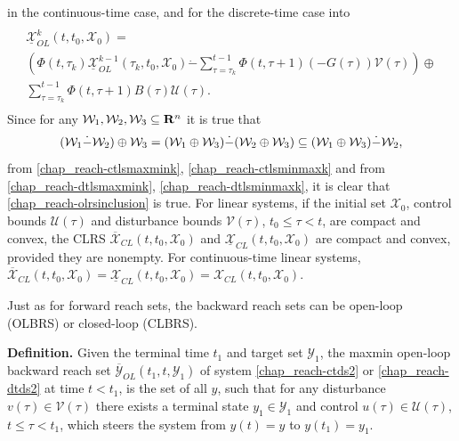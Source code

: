 \documentclass[letterpaper,10pt,english]{sphinxmanual}
\begin{document}
in the continuous-time case, and for the discrete-time case into
\label{chap_reach:equation-dtlsminmaxk}\begin{gather}
\begin{split}\begin{array}{l}
\underline{{\mathcal X}}_{OL}^k(t, t_0, {\mathcal X}_0) = \\
\left(\Phi(t, \tau_k)\underline{{\mathcal X}}_{OL}^{k-1}(\tau_k, t_0, {\mathcal X}_0) \dot{-}
\sum_{\tau=\tau_k}^{t-1}\Phi(t, \tau+1)(-G(\tau)){\mathcal V}(\tau)\right)
\oplus \\
\sum_{\tau=\tau_k}^{t-1}\Phi(t, \tau+1)B(\tau){\mathcal U}(\tau).
\end{array}\end{split}\label{chap_reach-dtlsminmaxk}
\end{gather}
Since for any
\({\mathcal W}_1, {\mathcal W}_2, {\mathcal W}_3 \subseteq {\bf R}^n\)
it is true that
\begin{gather}
\begin{split}({\mathcal W}_1 \dot{-} {\mathcal W}_2) \oplus {\mathcal W}_3 =
({\mathcal W}_1 \oplus {\mathcal W}_3) \dot{-} ({\mathcal W}_2 \oplus {\mathcal W}_3) \subseteq
({\mathcal W}_1 \oplus {\mathcal W}_3) \dot{-} {\mathcal W}_2,\end{split}\notag
\end{gather}
from \eqref{chap_reach-ctlsmaxmink}, \eqref{chap_reach-ctlsminmaxk} and from \eqref{chap_reach-dtlsmaxmink},
\eqref{chap_reach-dtlsminmaxk}, it is clear that \eqref{chap_reach-olrsinclusion} is true.
For linear systems, if the initial set \({\mathcal X}_0\), control
bounds \({\mathcal U}(\tau)\) and disturbance bounds
\({\mathcal V}(\tau)\), \(t_0\leqslant\tau<t\), are compact and
convex, the CLRS
\(\overline{{\mathcal X}}_{CL}(t, t_0, {\mathcal X}_0)\) and
\(\underline{{\mathcal X}}_{CL}(t, t_0, {\mathcal X}_0)\) are
compact and convex, provided they are nonempty. For continuous-time
linear systems,
\(\overline{{\mathcal X}}_{CL}(t, t_0, {\mathcal X}_0) = \underline{{\mathcal X}}_{CL}(t, t_0, {\mathcal X}_0) = {\mathcal X}_{CL}(t, t_0, {\mathcal X}_0)\).

Just as for forward reach sets, the backward reach sets can be open-loop
(OLBRS) or closed-loop (CLBRS).

\textbf{Definition.} Given the terminal time \(t_1\) and target set
\({\mathcal Y}_1\), the maxmin open-loop backward reach set
\(\overline{{\mathcal Y}}_{OL}(t_1, t, {\mathcal Y}_1)\) of system
\eqref{chap_reach-ctds2} or \eqref{chap_reach-dtds2} at time \(t<t_1\), is the set of all \(y\),
such that for any disturbance \(v(\tau)\in{\mathcal V}(\tau)\) there
exists a terminal state \(y_1\in{\mathcal Y}_1\) and control
\(u(\tau)\in{\mathcal U}(\tau)\), \(t\leqslant\tau<t_1\), which
steers the system from \(y(t)=y\) to \(y(t_1)=y_1\).
\end{document}

